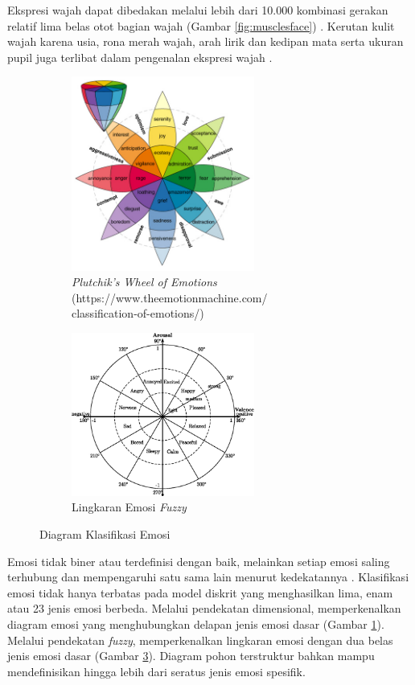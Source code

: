 Ekspresi wajah dapat dibedakan melalui lebih dari 10.000 kombinasi gerakan relatif lima belas otot bagian wajah (Gambar \ref{fig:musclesface}) . Kerutan kulit wajah karena usia, rona merah wajah, arah lirik dan kedipan mata serta ukuran pupil juga terlibat dalam pengenalan ekspresi wajah .

\begin{figure}[t]
    \centering
    \begin{subfigure}[t]{6cm}
        \includegraphics[width=6cm]{gambar/plutchik_wheel_emosi.jpg}
        \caption{\textit{Plutchik’s Wheel of Emotions} (https://www.theemotionmachine.com/\\classification-of-emotions/)}
        \label{fig:plutchikwheelemotions}
    \end{subfigure}
    \begin{subfigure}[t]{6cm}
        \includegraphics[width=6cm]{gambar/fuzzy_emosi.jpg}
        \caption{Lingkaran Emosi \textit{Fuzzy} \protect{}}
        \label{fig:diagramemosifuzzy}
    \end{subfigure}
    \caption{Diagram Klasifikasi Emosi}
\end{figure}
Emosi tidak biner atau terdefinisi dengan baik, melainkan setiap emosi saling terhubung dan mempengaruhi satu sama lain menurut kedekatannya . Klasifikasi emosi tidak hanya terbatas pada model diskrit yang menghasilkan lima, enam atau 23 jenis emosi berbeda. Melalui pendekatan dimensional,  memperkenalkan diagram emosi yang menghubungkan delapan jenis emosi dasar (Gambar \ref{fig:plutchikwheelemotions}). Melalui pendekatan \textit{fuzzy},  memperkenalkan lingkaran emosi dengan dua belas jenis emosi dasar (Gambar \ref{fig:diagramemosifuzzy}). Diagram pohon terstruktur  bahkan mampu mendefinisikan hingga lebih dari seratus jenis emosi spesifik.

